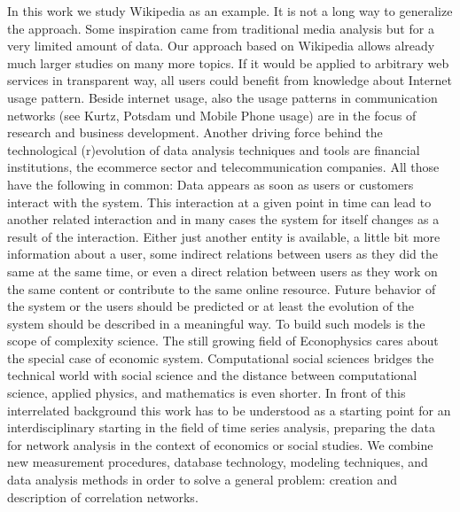 \documentclass[a4paper,10pt]{scrbook}
\begin{document}
In this work we study Wikipedia as an example. It is not a long way to generalize the approach. 
Some inspiration came from traditional media analysis \cite{Segev2010} but for a very limited amount of data. Our approach based on Wikipedia allows already much larger studies on many more topics. If it would be applied to arbitrary web services in transparent way, all users could benefit from knowledge about Internet usage pattern. Beside internet usage, also the usage patterns in communication networks (see Kurtz, Potsdam und Mobile Phone usage) are in the focus of research and business development. Another driving force behind the technological (r)evolution of data analysis techniques and tools are financial institutions, the ecommerce sector and telecommunication companies. All those have the following in common: Data appears as soon as users or customers interact with the system. This interaction at a given point in time can lead to another related interaction and in many cases the system for itself changes as a result of the interaction. Either just another entity is available, a little bit more information about a user, some indirect relations between users as they did the same at the same time, or even a direct relation between users as they work on the same content or contribute to the same online resource. Future behavior of the system or the users should be predicted or at least the evolution of the system should be described in a meaningful way. To build such models is the scope of complexity science. The still growing field of Econophysics cares about the special case of economic system. Computational social sciences bridges the technical world with social science and the distance between computational science, applied physics, and mathematics is even shorter. In front of this interrelated background this work has to be understood as a starting point for an interdisciplinary starting in the field of time series analysis, preparing the data for network analysis in the context of economics or social studies. We combine new  measurement procedures, database technology, modeling techniques, and data analysis methods in order to solve a general problem: creation and description of correlation networks. 
 
\end{document}
